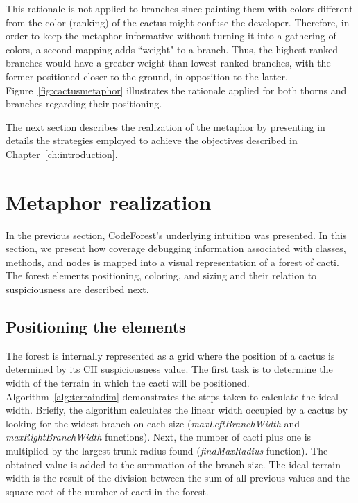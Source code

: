 This rationale is not applied to branches since painting them with  colors
different from the color (ranking) of the cactus might confuse the developer.
Therefore, in order to keep the metaphor informative without turning it into a
gathering of colors, a second mapping  adds ``weight" to a branch. Thus, the
highest ranked branches would have a greater weight than lowest ranked branches,
with the former positioned closer to the ground, in opposition to the latter.
Figure~\ref{fig:cactusmetaphor} illustrates the rationale applied for both
thorns and branches regarding their positioning.

The next section describes the realization of the metaphor by presenting in
details the strategies employed to achieve the objectives described in
Chapter~\ref{ch:introduction}.

\section{Metaphor realization}

In the previous section,  CodeForest's underlying intuition was presented. In
this section, we present how coverage debugging information associated with
classes, methods, and nodes is mapped into a visual representation of a forest
of cacti.  The  forest elements  positioning, coloring, and sizing  and their
relation to suspiciousness are described next.

\subsection{Positioning the elements}

The forest is internally represented as a grid where the position of a cactus is
determined by its CH suspiciousness value. The first task is to determine the
width of the terrain in which the cacti will be positioned.
Algorithm~\ref{alg:terraindim} demonstrates the steps taken to calculate the
ideal width. Briefly, the algorithm calculates the linear width occupied by a
cactus by looking for the widest branch on each size
(\textit{maxLeftBranchWidth} and \textit{maxRightBranchWidth} functions). Next,
the number of cacti plus one is multiplied by the largest trunk radius found
(\textit{findMaxRadius} function).
The obtained value is added to the summation of the branch size. The ideal
terrain width is the result of the division between the sum of all previous
values and the square root of the number of cacti in the forest.

